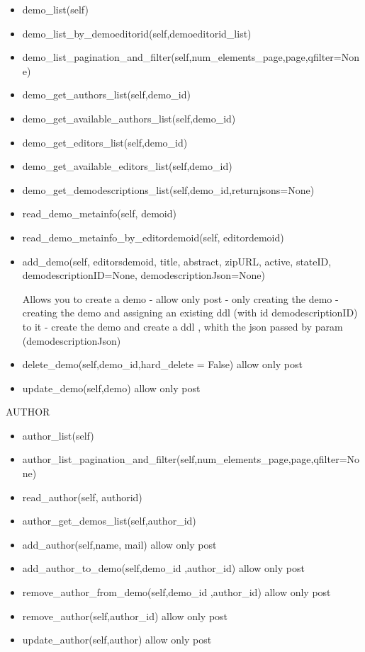 \begin{itemize}
\item  demo\_list(self)
\item  demo\_list\_by\_demoeditorid(self,demoeditorid\_list)
\item  demo\_list\_pagination\_and\_filter(self,num\_elements\_page,page,qfilter=None)
\item  demo\_get\_authors\_list(self,demo\_id)
\item  demo\_get\_available\_authors\_list(self,demo\_id)
\item  demo\_get\_editors\_list(self,demo\_id)
\item  demo\_get\_available\_editors\_list(self,demo\_id)
\item  demo\_get\_demodescriptions\_list(self,demo\_id,returnjsons=None)
\item  read\_demo\_metainfo(self, demoid)
\item  read\_demo\_metainfo\_by\_editordemoid(self, editordemoid)
\item  add\_demo(self, editorsdemoid, title, abstract, zipURL, active, stateID, demodescriptionID=None, demodescriptionJson=None)

Allows you to create a demo
- allow only post
- only creating the demo
- creating the demo and assigning an existing ddl (with id demodescriptionID) to it
- create the demo and create a ddl , whith the json passed by param (demodescriptionJson)

\item  delete\_demo(self,demo\_id,hard\_delete = False)
allow only post
\item  update\_demo(self,demo)
allow only post
\end{itemize}


AUTHOR

\begin{itemize}
\item  author\_list(self)
\item  author\_list\_pagination\_and\_filter(self,num\_elements\_page,page,qfilter=None)
\item  read\_author(self, authorid)
\item  author\_get\_demos\_list(self,author\_id)
\item  add\_author(self,name, mail)
allow only post
\item  add\_author\_to\_demo(self,demo\_id ,author\_id)
allow only post
\item  remove\_author\_from\_demo(self,demo\_id ,author\_id)
allow only post
\item  remove\_author(self,author\_id)
allow only post
\item  update\_author(self,author)
allow only post
\end{itemize}


